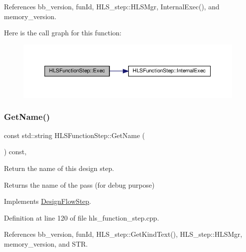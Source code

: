 References bb\+\_\+version, fun\+Id, H\+L\+S\+\_\+step\+::\+H\+L\+S\+Mgr, Internal\+Exec(), and memory\+\_\+version.

Here is the call graph for this function\+:
\nopagebreak
\begin{figure}[H]
\begin{center}
\leavevmode
\includegraphics[width=350pt]{d9/d41/classHLSFunctionStep_aa23c7b38f7775f2e11cee12a45173f95_cgraph}
\end{center}
\end{figure}
\mbox{\label{classHLSFunctionStep_ab070622813a99accede9dd5f6ba5a3cb}} 
\subsubsection{\texorpdfstring{Get\+Name()}{GetName()}}
{\footnotesize\ttfamily const std\+::string H\+L\+S\+Function\+Step\+::\+Get\+Name (\begin{DoxyParamCaption}{ }\end{DoxyParamCaption}) const\hspace{0.3cm}{\ttfamily [override]}, {\ttfamily [virtual]}}



Return the name of this design step. 

\begin{DoxyReturn}{Returns}
the name of the pass (for debug purpose) 
\end{DoxyReturn}


Implements \hyperlink{classDesignFlowStep_a01e5ebfab88db3b3b7f832f80075fad8}{Design\+Flow\+Step}.



Definition at line 120 of file hls\+\_\+function\+\_\+step.\+cpp.



References bb\+\_\+version, fun\+Id, H\+L\+S\+\_\+step\+::\+Get\+Kind\+Text(), H\+L\+S\+\_\+step\+::\+H\+L\+S\+Mgr, memory\+\_\+version, and S\+TR.



